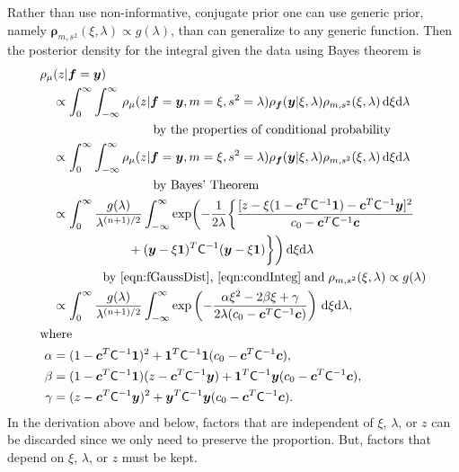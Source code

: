 \documentclass{iitthesis}          %
\newcommand{\bm}[1]{\boldsymbol{#1}}
\newcommand{\D}[1]{\text{d}{#1}}
\newcommand{\vc}{\bm{c}}
\newcommand{\vf}{\bm{f}}
\newcommand{\vrho}{\bm{\rho}}
\newcommand{\vy}{\bm{y}}
\newcommand{\vone}{\bm{1}}
\newcommand{\mC}{\mathsf{C}}
\begin{document}
Rather than use non-informative, conjugate prior one can use generic prior, namely $\vrho_{m,s^2}(\xi, \lambda) \propto g(\lambda)$, than can generalize to any generic function.
Then the posterior density for the integral given the data using Bayes theorem is
\begin{align*}
\MoveEqLeft[1]{\rho_{\mu}(z | \vf = \vy)} \\
& \propto \int_{0}^\infty \int_{-\infty}^\infty \rho_{\mu}(z | \vf = \vy, m = \xi, s^2 = \lambda)  \rho_{\vf}(\vy | \xi, \lambda ) \rho_{m, s^2}(\xi, \lambda) \, \D \xi \D \lambda \\
&\qquad \qquad \qquad \qquad \text{by the properties of conditional probability} 
\\
& \propto \int_{0}^\infty \int_{-\infty}^\infty \rho_{\mu}(z | \vf = \vy, m = \xi, s^2 = \lambda)  \rho_{\vf}(\vy | \xi, \lambda ) \rho_{m, s^2}(\xi, \lambda) \, \D \xi \D \lambda \\
&\qquad \qquad \qquad \qquad \text{by Bayes' Theorem} 
\\
& \propto \displaystyle \int_{0}^\infty  \frac{g(\lambda)}{\lambda^{(n+1)/2}} 
\int_{-\infty}^\infty  \exp \biggl( -\frac{1}{2\lambda}\biggl\{
\frac{
	[z - \xi (1 - \vc^T \mC^{-1} \vone)  -  \vc^T \mC^{-1} \vy]^2}
{c_0  -\vc ^T \mC^{-1} \vc}  \\
& \qquad \qquad \qquad  + (\vy - \xi \vone)^T \mC^{-1}(\vy - \xi \vone) \biggr \} \biggr) \, \D \xi \D \lambda \\
&\qquad \qquad
\text{by \eqref{eqn:fGaussDist}, \eqref{eqn:condInteg}} \; \text{and} \; \rho_{m,s^2}(\xi,\lambda) \propto g(\lambda) \\
& \propto \displaystyle \int_{0}^\infty  \frac{g(\lambda)}{\lambda^{(n+1)/2}} \int_{-\infty}^\infty  \exp\left( -\frac{\alpha \xi^2 -2 \beta \xi + \gamma}{2\lambda(c_0  -\vc ^T \mC^{-1} \vc)} \right) \, \D \xi \D \lambda, \\
\intertext{where}
\alpha & = (1 - \vc^T \mC^{-1} \vone)^2 + \vone^T \mC^{-1} \vone (c_0  -\vc ^T \mC^{-1} \vc),\\
\beta & =(1 - \vc^T \mC^{-1} \vone)(z - \vc^T \mC^{-1} \vy )
+ \vone^T \mC^{-1} \vy (c_0  -\vc ^T \mC^{-1} \vc),\\
\gamma &  = (z - \vc^T \mC^{-1} \vy )^2  + \vy^T \mC^{-1} \vy (c_0  -\vc ^T \mC^{-1} \vc).
\end{align*}
In the derivation above and below, factors that are independent of $\xi$, $\lambda$, or $z$ can be discarded since we only need to preserve the proportion.  But, factors that depend on $\xi$, $\lambda$, or $z$ must be kept.  
\end{document}

